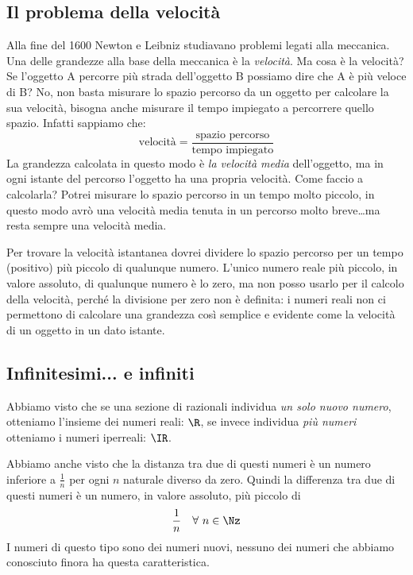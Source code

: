 \subsection{Il problema della velocità}
\label{subsec:insnum_velocita}

Alla fine del 1600 Newton e Leibniz studiavano problemi legati alla 
meccanica. 
Una delle grandezze alla base della meccanica è la \emph{velocità}. 
Ma cosa è la velocità? 
Se l'oggetto A percorre più strada dell'oggetto B possiamo dire 
che A è più veloce di B? No, non basta misurare lo spazio percorso da un 
oggetto per calcolare la sua velocità, bisogna anche misurare il tempo 
impiegato a percorrere quello spazio. Infatti sappiamo che:
\[\text{velocità} = 
  \frac{\text{spazio percorso}}{\text{tempo impiegato}}\]
La grandezza calcolata in questo modo è \emph{la velocità media} 
dell'oggetto, ma in ogni istante del percorso l'oggetto ha una propria 
velocità. 
Come faccio a calcolarla? Potrei misurare lo spazio percorso in un tempo 
molto piccolo, in questo modo avrò una velocità media tenuta in un percorso 
molto breve\dots ma resta sempre una velocità media. 

Per trovare la velocità istantanea dovrei dividere lo spazio percorso per 
un tempo (positivo) più piccolo di qualunque numero. L'unico numero reale
più piccolo, in valore assoluto, di qualunque numero è lo zero, ma 
non posso usarlo per il calcolo della velocità, perché la divisione per 
zero non è definita: i numeri reali non ci permettono di calcolare una 
grandezza così semplice e evidente come la velocità di un oggetto in un 
dato istante.


\subsection{Infinitesimi... e infiniti}
\label{subsec:insnum_nonarchimedei}

Abbiamo visto che se una sezione di razionali individua 
\emph{un solo nuovo numero}, 
otteniamo l'insieme dei numeri reali: \(\R\), se invece individua 
\emph{più numeri} otteniamo i numeri iperreali: \(\IR\).

Abbiamo anche visto che la distanza tra due di questi numeri è un numero 
inferiore a \(\frac{1}{n}\) per ogni \(n\) naturale diverso da zero.
Quindi la differenza tra due di questi numeri è un  numero, in valore 
assoluto, più piccolo di 
\[\frac{1}{n} \quad \forall~ n \in \Nz\]
I numeri di questo tipo sono dei numeri nuovi, nessuno dei numeri che 
abbiamo conosciuto finora ha questa caratteristica.

